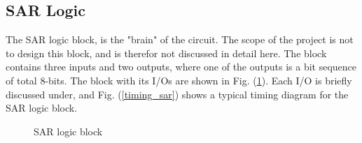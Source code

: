 \documentclass[english, 12pt, a4paper]{ifimaster}
\begin{document}
\subsection{SAR Logic}
The SAR logic block, is the "brain" of the circuit. The scope of the project is not to design this block, and is therefor not discussed in detail here. The block contains three inputs and 
two outputs, where one of the outputs is a bit sequence of total 8-bits. The block with its I/Os are shown in Fig. (\ref{sar:logic}). Each I/O is briefly discussed under, and Fig. (\ref{timing_sar})
shows a typical timing diagram for the SAR logic block.
\begin{figure}[!ht]
 \centering
 \caption{SAR logic block}
 \label{sar:logic}
\end{figure}
\end{document}
